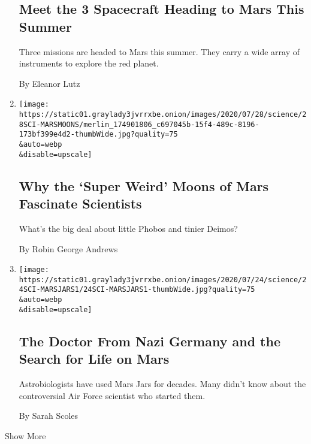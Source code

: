 \begin{enumerate}
  \hypertarget{meet-the-3-spacecraft-heading-to-mars-this-summer}{%
  \subsection{Meet the 3 Spacecraft Heading to Mars This
  Summer}\label{meet-the-3-spacecraft-heading-to-mars-this-summer}}

  Three missions are headed to Mars this summer. They carry a wide array
  of instruments to explore the red planet.

  By Eleanor Lutz
\item
  \href{/2020/07/25/science/mars-moons-phobos-deimos.html}{}

  \texttt{[image: https://static01.graylady3jvrrxbe.onion/images/2020/07/28/science/28SCI-MARSMOONS/merlin\_174901806\_c697045b-15f4-489c-8196-173bf399e4d2-thumbWide.jpg?quality=75\\\&auto=webp\\\&disable=upscale]}

  \hypertarget{why-the-super-weird-moons-of-mars-fascinate-scientists}{%
  \subsection{Why the `Super Weird' Moons of Mars Fascinate
  Scientists}\label{why-the-super-weird-moons-of-mars-fascinate-scientists}}

  What's the big deal about little Phobos and tinier Deimos?

  By Robin George Andrews
\item
  \href{/2020/07/24/science/mars-jars-strughold.html}{}

  \texttt{[image: https://static01.graylady3jvrrxbe.onion/images/2020/07/24/science/24SCI-MARSJARS1/24SCI-MARSJARS1-thumbWide.jpg?quality=75\\\&auto=webp\\\&disable=upscale]}

  \hypertarget{the-doctor-from-nazi-germany-and-the-search-for-life-on-mars}{%
  \subsection{The Doctor From Nazi Germany and the Search for Life on
  Mars}\label{the-doctor-from-nazi-germany-and-the-search-for-life-on-mars}}

  Astrobiologists have used Mars Jars for decades. Many didn't know
  about the controversial Air Force scientist who started them.

  By Sarah Scoles
\end{enumerate}

Show More

